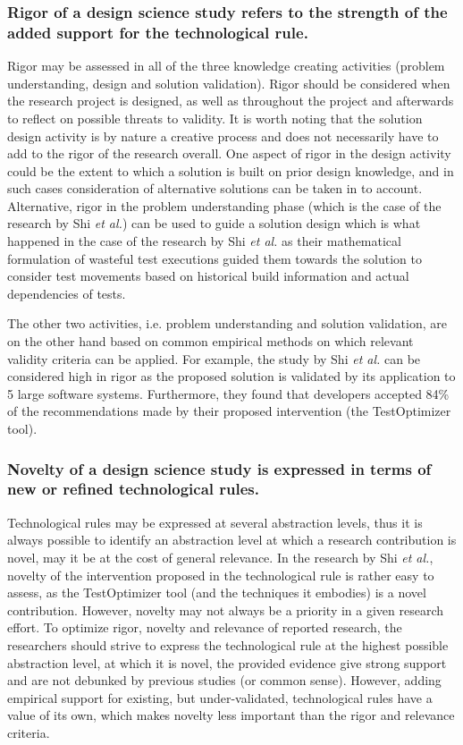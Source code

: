\documentclass[graybox]{svmult}
\begin{document}
\subsubsection{Rigor of a design science study refers to the strength of the added support for the technological rule.} Rigor may be assessed in all of the three knowledge creating activities (problem understanding, design and solution validation). 
Rigor should be considered when the research project is designed, as well as throughout the project and afterwards to reflect on possible threats to validity. 
It is worth noting that the solution design activity is by nature a creative process and does not necessarily have to add to the rigor of the research overall. One aspect of rigor in the design activity could be the extent to which a solution is built on prior design knowledge, and in such cases consideration of alternative solutions can be taken in to account. 
Alternative, rigor in the problem understanding phase (which is the case of the research by Shi \emph{et al.}) can be used to guide a solution design which is what happened in the case of the research by Shi \emph{et al.} as their mathematical formulation of wasteful test executions guided them towards the solution to consider test movements based on historical build information and actual dependencies of tests. 

The other two activities, i.e. problem understanding and solution validation, are on the other hand based on common empirical methods on which relevant validity criteria can be applied. For example, the study by Shi \emph{et al.} can be considered high in rigor as the proposed solution is validated by its application to 5 large software systems.  Furthermore, they found that developers accepted 84\% of the recommendations made by their proposed intervention (the TestOptimizer tool). 

\subsubsection{Novelty of a design science study is expressed in terms of new or refined technological rules.} Technological rules may be expressed at several abstraction levels, thus it is always possible to identify an abstraction level at which a research contribution is novel, may it be at the cost of general relevance.  In the research by Shi \emph{et al.}, novelty of the intervention proposed in the technological rule is rather easy to assess, as the TestOptimizer tool (and the techniques it embodies) is a novel contribution.  
However, novelty may not always be a priority in a given research effort.
To optimize rigor, novelty and relevance of reported research, the researchers should strive to express the technological rule at the highest possible abstraction level, at which it is novel, the provided evidence give strong support and are not debunked by previous studies (or common sense). However, adding empirical support for existing, but under-validated, technological rules have a value of its own, which makes novelty less important than the rigor and relevance criteria.
\end{document}
